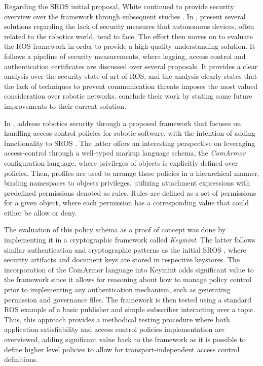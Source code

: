 Regarding the SROS \cite{white2016sros} initial proposal, White continued to provide security overview over the framework through subsequent studies \cite{white2018procedurally, white2019network}. In , \citeauthor*{caiazza2019enhancing} present several solutions regarding the lack of security measures that autonomous devices, often related to the robotics world, tend to face. The effort then moves on to evaluate the ROS framework in order to provide a high-quality understanding solution. It follows a pipeline of security measurements, where logging, access control and authentication certificates are discussed over several proposals. It provides a clear analysis over the security state-of-art of ROS, and the analysis clearly states that the lack of techniques to prevent communication threats imposes the most valued consideration over robotic networks. \citeauthor*{caiazza2019enhancing} conclude their work by stating some future improvements to their current solution. 

In , \citeauthor*{white2018procedurally} address robotics security through a proposed framework that focuses on handling access control policies for robotic software, with the intention of adding functionality to SROS \cite{white2016sros}. The latter offers an interesting perspective on leveraging access-control through a well-typed markup language schema, the \textit{ComArmor} configuration language, where privileges of objects is explicitly defined over policies. Then, profiles are used to arrange these policies in a hierarchical manner, binding namespaces to objects privileges, utilizing attachment expressions with predefined permissions denoted as rules. Rules are defined as a set of permissions for a given object, where each permission has a corresponding value that could either be allow or deny. 

The evaluation of this policy schema as a proof of concept was done by implementing it in a cryptographic framework called \textit{Keymint}. The latter follows similar authentication and cryptographic patterns as the initial SROS \cite{white2016sros}, where security artifacts and document keys are stored in respective keystores. The incorporation of the ComArmor language into Keymint adds significant value to the framework since it allows for reasoning about how to manage policy control prior to implementing any authentication mechanism, such as generating permission and governance files. The framework is then tested using a standard ROS example of a basic publisher and simple subscriber interacting over a topic. Thus, this approach provides a methodical testing procedure where both application satisfiability and access control policies implementation are overviewed, adding significant value back to the framework as it is possible to define higher level policies to allow for transport-independent access control definitions.

